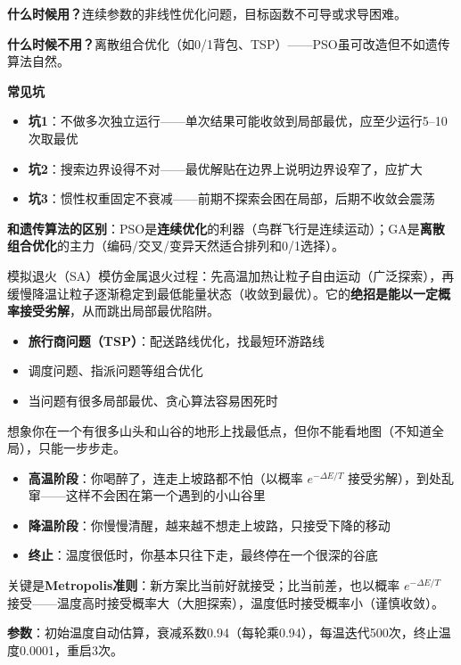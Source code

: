 \begin{algonotes}
\textbf{什么时候用？}连续参数的非线性优化问题，目标函数不可导或求导困难。

\textbf{什么时候不用？}离散组合优化（如0/1背包、TSP）——PSO虽可改造但不如遗传算法自然。

\textbf{常见坑}
\begin{itemize}
    \item \textbf{坑1}：不做多次独立运行——单次结果可能收敛到局部最优，应至少运行5--10次取最优
    \item \textbf{坑2}：搜索边界设得不对——最优解贴在边界上说明边界设窄了，应扩大
    \item \textbf{坑3}：惯性权重固定不衰减——前期不探索会困在局部，后期不收敛会震荡
\end{itemize}

\textbf{和遗传算法的区别}：PSO是\textbf{连续优化}的利器（鸟群飞行是连续运动）；GA是\textbf{离散组合优化}的主力（编码/交叉/变异天然适合排列和0/1选择）。
\end{algonotes}


\begin{algointro}
模拟退火（SA）模仿金属退火过程：先高温加热让粒子自由运动（广泛探索），再缓慢降温让粒子逐渐稳定到最低能量状态（收敛到最优）。它的\textbf{绝招是能以一定概率接受劣解}，从而跳出局部最优陷阱。
\end{algointro}

\begin{algoscene}
\begin{itemize}
    \item \textbf{旅行商问题（TSP）}：配送路线优化，找最短环游路线
    \item 调度问题、指派问题等组合优化
    \item 当问题有很多局部最优、贪心算法容易困死时
\end{itemize}
\end{algoscene}

\begin{algoprinciple}
想象你在一个有很多山头和山谷的地形上找最低点，但你不能看地图（不知道全局），只能一步步走。

\begin{itemize}
    \item \textbf{高温阶段}：你喝醉了，连走上坡路都不怕（以概率 $e^{-\Delta E/T}$ 接受劣解），到处乱窜——这样不会困在第一个遇到的小山谷里
    \item \textbf{降温阶段}：你慢慢清醒，越来越不想走上坡路，只接受下降的移动
    \item \textbf{终止}：温度很低时，你基本只往下走，最终停在一个很深的谷底
\end{itemize}

关键是\textbf{Metropolis准则}：新方案比当前好就接受；比当前差，也以概率 $e^{-\Delta E/T}$ 接受——温度高时接受概率大（大胆探索），温度低时接受概率小（谨慎收敛）。

\textbf{参数}：初始温度自动估算，衰减系数0.94（每轮乘0.94），每温迭代500次，终止温度0.0001，重启3次。
\end{algoprinciple}

